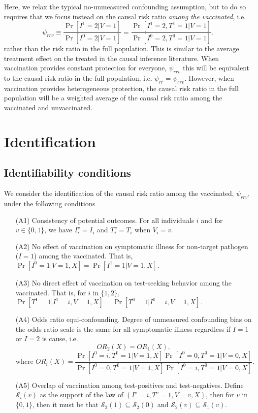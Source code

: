 \documentclass[11pt]{article}
\begin{document}
Here, we relax the typical no-unmeasured confounding assumption, but to do so requires that we focus instead on the causal risk ratio \textit{among the vaccinated}, i.e.
\begin{equation*}
    \psi_{rrv} \equiv \dfrac{\Pr[I^1 = 2 | V = 1]}{\Pr[I^0 = 2 | V = 1]} = \dfrac{\Pr[I^1 = 2, T^1 = 1 | V = 1]}{\Pr[I^0 = 2, T^0 = 1 | V = 1]}.
\end{equation*}
rather than the risk ratio in the full population. This is similar to the average treatment effect on the treated in the causal inference literature. When vaccination provides constant protection for everyone, $\psi_{rrv}$ this will be equivalent to the causal risk ratio in the full population, i.e. $\psi_{rr} = \psi_{rrv}$. However, when vaccination provides heterogeneous protection, the causal risk ratio in the full population will be a weighted average of the causal risk ratio among the vaccinated and unvaccinated.

\section{Identification} \label{sec:identification}
\subsection{Identifiability conditions} \label{sec:conditions}
We consider the identification of the causal risk ratio among the vaccinated, $\psi_{rrv}$, under the following conditions
\begin{itemize}
    \item[(A1)] Consistency of potential outcomes. For all individuals $i$ and for $v \in \{0, 1\}$, we have $I_i^v = I_i$ and $T_i^v = T_i$ when $V_i = v$.
    \item[(A2)] No effect of vaccination on symptomatic illness for non-target pathogen ($I = 1$) among the vaccinated. That is, $\Pr[I^0 = 1 | V = 1, X] = \Pr[I^1 = 1 | V = 1, X].$
    \item[(A3)] No direct effect of vaccination on test-seeking behavior among the vaccinated. That is, for $i$ in $\{1,2\}$, $\Pr[T^1 = 1 | I^1 = i, V = 1, X] = \Pr[T^0 = 1 | I^0 = i, V = 1, X].$
    \item[(A4)] Odds ratio equi-confounding. Degree of unmeasured confounding bias on the odds ratio scale is the same for all symptomatic illness regardless if $I=1$ or $I=2$ is cause, i.e. 
    $$OR_2(X) = OR_1(X), $$
    $$ \text{where } OR_i(X) = \frac{\Pr[I^0 = i, T^0 = 1 | V = 1, X]\Pr[I^0 = 0, T^0 = 1 | V = 0, X]}{\Pr[I^0 = 0, T^0 = 1 | V = 1, X]\Pr[I^0 = i, T^0 = 1| V = 0, X]}.$$
    \item[(A5)] Overlap of vaccination among test-positives and test-negatives. Define $\mathcal{S}_i(v)$ as the support of the law of $(I^v = i, T^v = 1, V = v, X)$, then for $v$ in $\{0,1\}$, then it must be that $\mathcal{S}_2(1) \subseteq \mathcal{S}_2(0)$ and $\mathcal{S}_2(v) \subseteq \mathcal{S}_1(v).$
\end{itemize}
\end{document}
